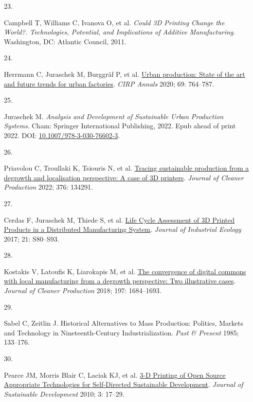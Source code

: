 \documentclass[
  11pt,
  a4paperpaper,
  onecolumn]{article}
\newlength{\cslhangindent}
\newlength{\csllabelwidth}
\newlength{\cslentryspacingunit} %
\newenvironment{CSLReferences}[2] %
 {%
  \setlength{\parindent}{0pt}
  \ifodd #1
  \let\oldpar\par
  \def\par{\hangindent=\cslhangindent\oldpar}
  \fi
  \setlength{\parskip}{#2\cslentryspacingunit}
 }%
 {}
\newcommand{\CSLLeftMargin}[1]{\parbox[t]{\csllabelwidth}{#1}}
\newcommand{\CSLRightInline}[1]{\parbox[t]{\linewidth - \csllabelwidth}{#1}\break}
\begin{document}
\begin{CSLReferences}{0}{0}
\leavevmode{}%
\CSLLeftMargin{23. }%
\CSLRightInline{Campbell T, Williams C, Ivanova O, et al. \emph{Could
{3D Printing Change} the {World}?. {Technologies}, {Potential}, and
{Implications} of {Additive Manufacturing}}. {Washington, DC}: {Atlantic
Council}, 2011.}

\leavevmode{}%
\CSLLeftMargin{24. }%
\CSLRightInline{Herrmann C, Juraschek M, Burggräf P, et al.
\href{https://doi.org/10.1016/j.cirp.2020.05.003}{Urban production:
{State} of the art and future trends for urban factories}. \emph{CIRP
Annals} 2020; 69: 764--787.}

\leavevmode{}%
\CSLLeftMargin{25. }%
\CSLRightInline{Juraschek M. \emph{Analysis and {Development} of
{Sustainable Urban Production Systems}}. {Cham}: {Springer International
Publishing}, 2022. Epub ahead of print 2022. DOI:
\href{https://doi.org/10.1007/978-3-030-76602-3}{10.1007/978-3-030-76602-3}.}

\leavevmode{}%
\CSLLeftMargin{26. }%
\CSLRightInline{Priavolou C, Troullaki K, Tsiouris N, et al.
\href{https://doi.org/10.1016/j.jclepro.2022.134291}{Tracing sustainable
production from a degrowth and localisation perspective: {A} case of
{3D} printers}. \emph{Journal of Cleaner Production} 2022; 376: 134291.}

\leavevmode{}%
\CSLLeftMargin{27. }%
\CSLRightInline{Cerdas F, Juraschek M, Thiede S, et al.
\href{https://doi.org/10.1111/jiec.12618}{Life {Cycle Assessment} of {3D
Printed Products} in a {Distributed Manufacturing System}}.
\emph{Journal of Industrial Ecology} 2017; 21: S80--S93.}

\leavevmode{}%
\CSLLeftMargin{28. }%
\CSLRightInline{Kostakis V, Latoufis K, Liarokapis M, et al.
\href{https://doi.org/10.1016/j.jclepro.2016.09.077}{The convergence of
digital commons with local manufacturing from a degrowth perspective:
{Two} illustrative cases}. \emph{Journal of Cleaner Production} 2018;
197: 1684--1693.}

\leavevmode{}%
\CSLLeftMargin{29. }%
\CSLRightInline{Sabel C, Zeitlin J. Historical {Alternatives} to {Mass
Production}: {Politics}, {Markets} and {Technology} in
{Nineteenth-Century Industrialization}. \emph{Past \& Present} 1985;
133--176.}

\leavevmode{}%
\CSLLeftMargin{30. }%
\CSLRightInline{Pearce JM, Morris Blair C, Laciak KJ, et al.
\href{https://doi.org/10.5539/jsd.v3n4p17}{3-{D Printing} of {Open
Source Appropriate Technologies} for {Self-Directed Sustainable
Development}}. \emph{Journal of Sustainable Development} 2010; 3:
17--29.}


\end{CSLReferences}
\end{document}
